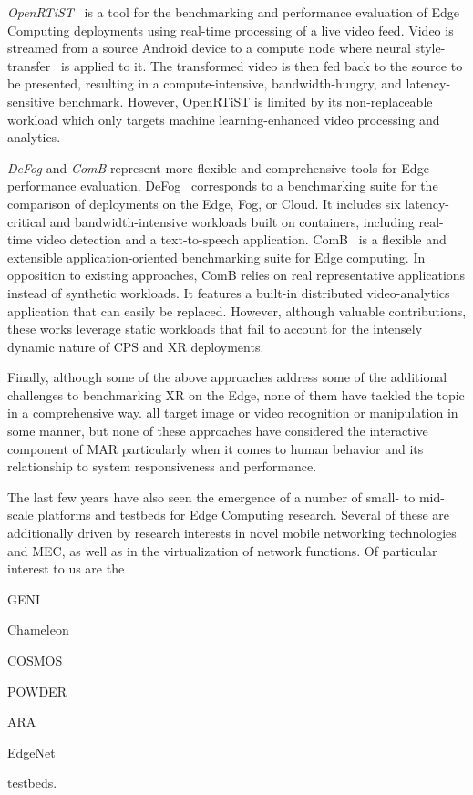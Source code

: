 \emph{OpenRTiST}~\cite{george2020openrtist} is a tool for the benchmarking and performance evaluation of Edge Computing deployments using real-time processing of a live video feed.
Video is streamed from a source Android device to a compute node where neural style-transfer~\cite{gatys2016image} is applied to it.
The transformed video is then fed back to the source to be presented, resulting in a compute-intensive, bandwidth-hungry, and latency-sensitive benchmark.
However, OpenRTiST is limited by its non-replaceable workload which only targets machine learning-enhanced video processing and analytics.

\emph{DeFog} and \emph{ComB} represent more flexible and comprehensive tools for Edge performance evaluation.
DeFog~\cite{mcchesney2019defog} corresponds to a benchmarking suite for the comparison of deployments on the Edge, Fog, or Cloud.
It includes six latency-critical and bandwidth-intensive workloads built on containers, including real-time video detection and a text-to-speech application.
ComB~\cite{baurle2022comb} is a flexible and extensible application-oriented benchmarking suite for Edge computing.
In opposition to existing approaches, ComB relies on real representative applications instead of synthetic workloads.
It features a built-in distributed video-analytics application that can easily be replaced.
However, although valuable contributions, these works leverage static workloads that fail to account for the intensely dynamic nature of \gls{CPS} and \gls{XR} deployments.

Finally, although some of the above approaches address some of the additional challenges to benchmarking \gls{XR} on the Edge, none of them have tackled the topic in a comprehensive way.\@
\cite{das2018edgebench,mcchesney2019defog,baurle2022comb,george2020openrtist} all target image or video recognition or manipulation in some manner, but none of these approaches have considered the interactive component of \gls{MAR} particularly when it comes to human behavior and its relationship to system responsiveness and performance.

\medskip

The last few years have also seen the emergence of a number of small- to mid-scale platforms and testbeds for Edge Computing research.
Several of these are additionally driven by research interests in novel mobile networking technologies and \gls{MEC}, as well as in the virtualization of network functions.
Of particular interest to us are the
\begin{inlineenum}
    \item \acs{GENI}
    \item Chameleon
    \item \acs{COSMOS}
    \item \acs{POWDER}
    \item \acs{ARA}
    \item EdgeNet
\end{inlineenum} testbeds.

